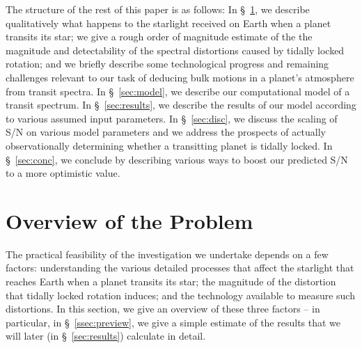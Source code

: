 \documentclass[12pt,preprint]{aastex}
\begin{document}
The structure of the rest of this paper is as follows:
In \S~\ref{sec:overview}, we describe qualitatively what happens to
the starlight received on Earth when a planet transits its star; we
give a rough order of magnitude estimate of the the magnitude and
detectability of the spectral distortions caused by tidally locked
rotation; and we briefly describe some technological progress and
remaining challenges relevant to our task of deducing bulk motions
in a planet's atmosphere from transit spectra.  In \S~\ref{sec:model},
we describe our computational model of a transit spectrum.
In \S~\ref{sec:results}, we describe the results of our model
according to various assumed input parameters.
In \S~\ref{sec:disc}, we discuss the scaling of S/N on various model
parameters and we address the prospects of actually observationally
determining whether a transitting planet is tidally locked.  In
\S~\ref{sec:conc}, we conclude
by describing various ways to boost our predicted S/N to a more
optimistic value.



\section{Overview of the Problem}
\label{sec:overview}

The practical feasibility of the investigation we undertake depends on a
few factors: understanding the various detailed processes that affect
the starlight that reaches Earth when a planet transits its star; the
magnitude of the distortion that tidally locked rotation induces; and the
technology available to measure such distortions.  In this section, we
give an overview of these three factors -- in particular, in
\S~\ref{ssec:preview}, we give a simple estimate of the results that
we will later (in \S~\ref{sec:results}) calculate in detail.
\end{document}
